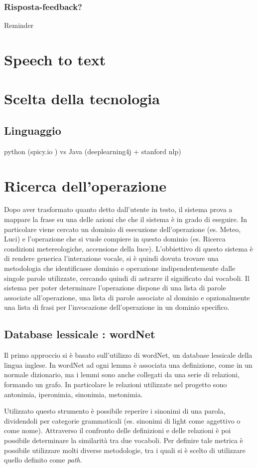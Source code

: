 \documentclass[twoside]{supsistudent}
\begin{document}
\subsection{Risposta-feedback?}
Reminder
\chapter{Speech to text}
\chapter{Scelta della tecnologia}
\section{Linguaggio}
python (spicy.io ) vs Java (deeplearning4j + stanford nlp)
\chapter{Ricerca dell'operazione}
Dopo aver trasformato quanto detto dall'utente in testo, il sistema prova a mappare la frase su una delle azioni che che il sistema è in grado di eseguire.
In particolare viene cercato un dominio di esecuzione dell'operazione (es. Meteo, Luci) e l'operazione che si vuole compiere in questo dominio (es. Ricerca condizioni metereologiche, accensione della luce).
L'obbiettivo di questo sistema è di rendere generica l'interazione vocale, si è quindi dovuta trovare una metodologia che identificasse dominio e operazione indipendentemente dalle singole parole utilizzate, cercando quindi di astrarre il significato dai vocaboli. Il sistema per poter determinare l'operazione dispone di una lista di parole associate all'operazione, una lista di parole associate al dominio e opzionalmente una lista di frasi per l'invocazione dell'operazione in un dominio specifico.

\section{Database lessicale : wordNet}
Il primo approccio si è basato sull'utilizzo di wordNet, un database lessicale della lingua inglese.
In wordNet ad ogni lemma è associata una definizione, come in un normale dizionario, ma i lemmi sono anche collegati da una serie di relazioni, formando un grafo. In particolare le relazioni utilizzate nel progetto sono antonimia, iperonimia, sinonimia, metonimia.\cite{wordNet}

Utilizzato questo strumento è possibile reperire i sinonimi di una parola, dividendoli per categorie grammaticali (es. sinonimi di light come aggettivo o come nome).
Attraverso il confronto delle definizioni e delle relazioni è poi possibile determinare la similarità tra due vocaboli. Per definire tale metrica è possibile utilizzare molti diverse metodologie, tra i quali si è scelto di utilizzare quello definito come \textit{path}. \cite{wordNetWordSimilarity}
\end{document}
